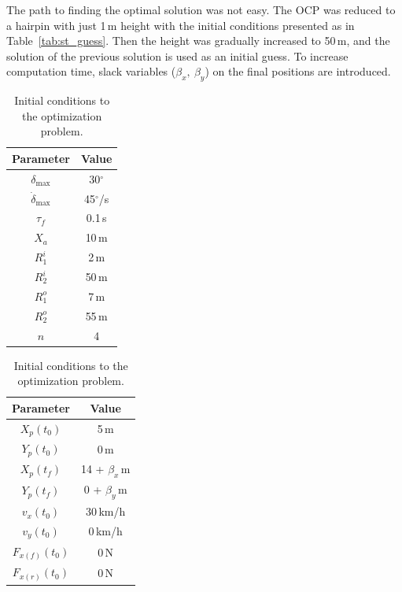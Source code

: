 The path to finding the optimal solution was not easy. The OCP was reduced to a hairpin with just 1\,m height with the initial conditions presented as in Table~\ref{tab:st_guess}. Then the height was gradually increased to 50\,m, and the solution of the previous solution is used as an initial guess. To increase computation time, slack variables ($\beta_x,\ \beta_y$) on the final positions are introduced. 

\begin{table}[h!]
    \begin{subtable}{0.3\textwidth}
        \begin{tabular}{c|c}
            Parameter & Value \\
            \hline
            $\delta_{\text{max}}$ & 30$^\circ$ \\
            $\dot \delta_{\text{max}}$ & 45$^\circ$/s\\
            $\tau_f$ & 0.1\,s\\
            $X_a$ & 10\,m\\
            $R_1^i$ & 2\,m\\
            $R_2^i$ & 50\,m\\
            $R_1^o$ & 7\,m\\
            $R_2^o$ & 55\,m\\
            $n$ & 4\\
        \end{tabular}
        \caption{Constraints on the optimization problem.}
        \label{tab:st_const}
    \end{subtable}
    \hfill
    \begin{subtable}{0.3\textwidth}
        \begin{tabular}{c|c}
            Parameter & Value \\
            \hline
            $X_p(t_0)$ & 5\,m\\
            $Y_p(t_0)$ & 0\,m\\
            $X_p(t_f)$ & 14 + $\beta_x$\,m\\
            $Y_p(t_f)$ & 0 + $\beta_y$\,m\\
            $v_x(t_0)$ & 30\,km/h\\
            $v_y(t_0)$ & 0\,km/h\\
            $F_{x(f)}(t_0)$ & 0\,N\\
            $F_{x(r)}(t_0)$ & 0\,N\\
        \end{tabular}
        \caption{Initial conditions to the optimization problem.}

\end{subtable}
\end{table}
